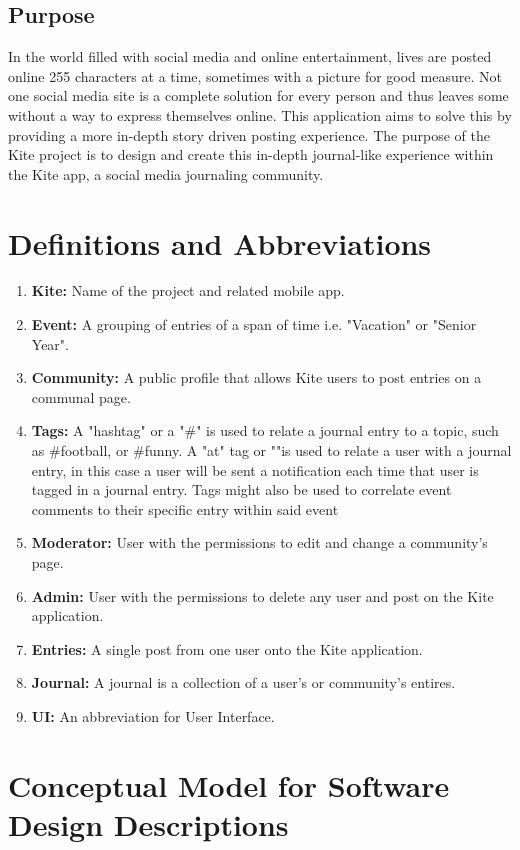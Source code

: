 \documentclass[compsoc, 10, draftclsnofoot, onecolumn]{IEEEtran}
\begin{document}
\subsection{Purpose}
In the world filled with social media and online entertainment, lives are posted online 255 characters at a time, sometimes with a picture for good measure. Not one social media site is a complete solution for every person and thus leaves some without a way to express themselves online. This application aims to solve this by providing a more in-depth story driven posting experience. The purpose of the Kite project is to design and create this in-depth journal-like experience within the Kite app, a social media journaling community.

\section{Definitions and Abbreviations}
\begin{enumerate}
\item \textbf{Kite: } Name of the project and related mobile app.
\item \textbf{Event: } A grouping of entries of a span of time i.e. "Vacation" or "Senior Year".
\item \textbf{Community: } A public profile that allows Kite users to post entries on a communal page.
\item \textbf{Tags: } A "hashtag" or a "\#" is used to relate a journal entry to a topic, such as \#football, or \#funny. A "at" tag or "\@"is used to relate a user with a journal entry, in this case a user will be sent a notification each time that user is tagged in a journal entry. Tags might also be used to correlate event comments to their specific entry within said event
\item \textbf{Moderator: } User with the permissions to edit and change a community's page.
\item \textbf{Admin: } User with the permissions to delete any user and post on the Kite application.
\item \textbf{Entries: } A single post from one user onto the Kite application.
\item \textbf{Journal: } A journal is a collection of a user's or community's entires.
\item \textbf{UI: } An abbreviation for User Interface.
\end{enumerate}

\section{Conceptual Model for Software Design Descriptions }
\end{document}
